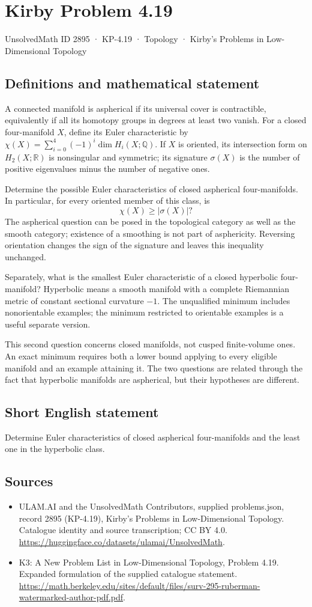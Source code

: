 \documentclass[11pt,a4paper]{article}
\begin{document}
\section*{Kirby Problem 4.19}\label{2895}
{\small UnsolvedMath ID 2895 · KP-4.19 · Topology · Kirby's Problems in Low-Dimensional Topology}
\subsection{Definitions and mathematical statement}
A connected manifold is aspherical if its universal cover is contractible, equivalently if all its homotopy groups in degrees at least two vanish. For a closed four-manifold $X$, define its Euler characteristic by $\chi(X)=\sum_{i=0}^4(-1)^i\dim H_i(X;\mathbb Q)$. If $X$ is oriented, its intersection form on $H_2(X;\mathbb R)$ is nonsingular and symmetric; its signature $\sigma(X)$ is the number of positive eigenvalues minus the number of negative ones.

Determine the possible Euler characteristics of closed aspherical four-manifolds. In particular, for every oriented member of this class, is
\[
\chi(X)\ge |\sigma(X)|?
\]
The aspherical question can be posed in the topological category as well as the smooth category; existence of a smoothing is not part of asphericity. Reversing orientation changes the sign of the signature and leaves this inequality unchanged.

Separately, what is the smallest Euler characteristic of a closed hyperbolic four-manifold? Hyperbolic means a smooth manifold with a complete Riemannian metric of constant sectional curvature $-1$. The unqualified minimum includes nonorientable examples; the minimum restricted to orientable examples is a useful separate version.

This second question concerns closed manifolds, not cusped finite-volume ones. An exact minimum requires both a lower bound applying to every eligible manifold and an example attaining it. The two questions are related through the fact that hyperbolic manifolds are aspherical, but their hypotheses are different.
\subsection{Short English statement}
Determine Euler characteristics of closed aspherical four-manifolds and the least one in the hyperbolic class.
\subsection{Sources}
\begin{itemize}
\item[S1] ULAM.AI and the UnsolvedMath Contributors, supplied problems.json, record 2895 (KP-4.19), Kirby's Problems in Low-Dimensional Topology. Catalogue identity and source transcription; CC BY 4.0.
\url{https://huggingface.co/datasets/ulamai/UnsolvedMath}.
\item[S2] K3: A New Problem List in Low-Dimensional Topology, Problem 4.19. Expanded formulation of the supplied catalogue statement.
\url{https://math.berkeley.edu/sites/default/files/surv-295-ruberman-watermarked-author-pdf.pdf}.
\end{itemize}
\end{document}

